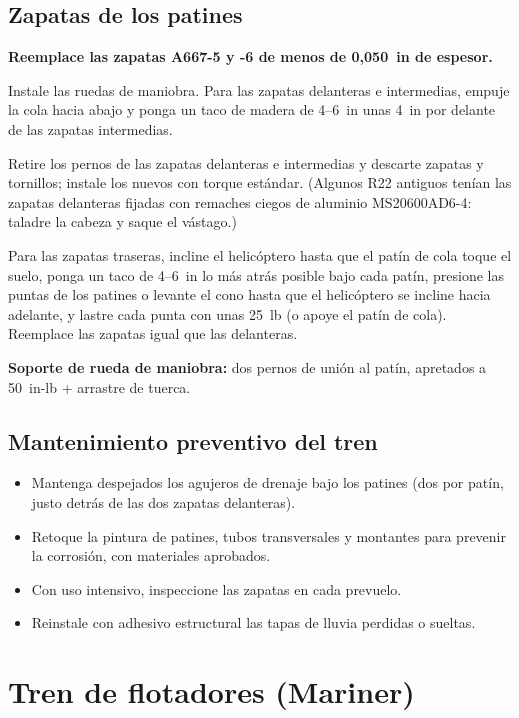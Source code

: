 \subsection{Zapatas de los patines}

\textbf{Reemplace las zapatas A667-5 y -6 de menos de 0,050~in de espesor.}

\begin{pasos}
\item Instale las ruedas de maniobra. Para las zapatas delanteras e intermedias, empuje la cola hacia abajo y ponga un taco de madera de 4--6~in unas 4~in por delante de las zapatas intermedias.
\item Retire los pernos de las zapatas delanteras e intermedias y descarte zapatas y tornillos; instale los nuevos con torque estándar. (Algunos R22 antiguos tenían las zapatas delanteras fijadas con remaches ciegos de aluminio MS20600AD6-4: taladre la cabeza y saque el vástago.)
\item Para las zapatas traseras, incline el helicóptero hasta que el patín de cola toque el suelo, ponga un taco de 4--6~in lo más atrás posible bajo cada patín, presione las puntas de los patines o levante el cono hasta que el helicóptero se incline hacia adelante, y lastre cada punta con unas 25~lb (o apoye el patín de cola). Reemplace las zapatas igual que las delanteras.
\end{pasos}

\textbf{Soporte de rueda de maniobra:} dos pernos de unión al patín, apretados a 50~in-lb + arrastre de tuerca.

\subsection{Mantenimiento preventivo del tren}

\begin{itemize}
\item Mantenga despejados los agujeros de drenaje bajo los patines (dos por patín, justo detrás de las dos zapatas delanteras).
\item Retoque la pintura de patines, tubos transversales y montantes para prevenir la corrosión, con materiales aprobados.
\item Con uso intensivo, inspeccione las zapatas en cada prevuelo.
\item Reinstale con adhesivo estructural las tapas de lluvia perdidas o sueltas.
\end{itemize}

\section{Tren de flotadores (Mariner)}

